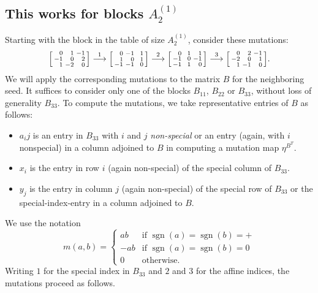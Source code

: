 \documentclass{amsart}
\theoremstyle{definition}
\theoremstyle{remark}
\numberwithin{equation}{section}
\newcommand{\sgn}{\operatorname{sgn}}
\newcommand{\0}{{\mathbf{0}}}
\begin{document}
\subsection{This works for blocks $A_2^{(1)}$}
Starting with the block in the table of size $A_2^{(1)}$, consider these mutations:
\[
\begin{bsmallmatrix*}[r]
0&1&-1\\
-1&0&2\\
1&-2&0
\end{bsmallmatrix*}
\overset{1}{\longrightarrow}
\begin{bsmallmatrix*}[r]
0&-1&\,\,\,1\\
1&0&1\\
-1&-1&0
\end{bsmallmatrix*}
\overset{2}{\longrightarrow}
\begin{bsmallmatrix*}[r]
0&\,\,\,1&1\\
-1&0&-1\\
-1&1&0
\end{bsmallmatrix*}
\overset{3}{\longrightarrow}
\begin{bsmallmatrix*}[r]
0&2&-1\\
-2&0&1\\
1&-1&0
\end{bsmallmatrix*}.
\]
We will apply the corresponding mutations to the matrix $B$ for the neighboring seed.
It suffices to consider only one of the blocks $B_{11}$, $B_{22}$ or $B_{33}$, without loss of generality $B_{33}$.
To compute the mutations, we take representative entries of $B$ as follows:
\begin{itemize}
\item $a_ij$ is an entry in $B_{33}$ with $i$ and $j$ \emph{non-special} or an entry (again, with $i$ nonspecial) in a column adjoined to $B$ in computing a mutation map $\eta^{B^T}$.
\item
$x_i$ is the entry in row $i$ (again non-special) of the special column of $B_{33}$.
\item
$y_j$ is the entry in column $j$ (again non-special) of the special row of $B_{33}$ or the special-index-entry in a column adjoined to $B$.
\end{itemize}
We use the notation 
\[m(a,b)=\begin{cases}
ab&\text{if }\sgn(a)=\sgn(b)=+\\
-ab&\text{if }\sgn(a)=\sgn(b)=0\\
0&\text{otherwise}.
\end{cases}\]
Writing $1$ for the special index in $B_{33}$ and $2$ and $3$ for the affine indices, the mutations proceed as follows.
\end{document}
